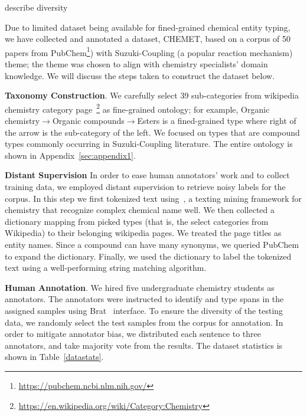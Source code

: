 describe diversity

Due to limited dataset being available for fined-grained chemical entity typing, we have collected and annotated a dataset, CHEMET, based on a corpus of 50 papers from PubChem\footnote{\url{https://pubchem.ncbi.nlm.nih.gov/}}) with Suzuki-Coupling (a popular reaction mechanism) theme; the theme was chosen to align with chemistry specialists' domain knowledge. We will discuss the steps taken to construct the dataset below.

\noindent \textbf{Taxonomy Construction}.  We carefully select 39 sub-categories from wikipedia chemistry category page~\footnote{\url{https://en.wikipedia.org/wiki/Category:Chemistry}} as fine-grained ontology; for example, Organic chemistry$\rightarrow$Organic compounds$\rightarrow$Esters is a fined-grained type where right of the arrow is the sub-category of the left.  We focused on types that are compound types commonly occurring in Suzuki-Coupling literature. The entire ontology is shown in Appendix~\ref{sec:appendix1}.

\noindent \textbf{Distant Supervision} In order to ease human annotators' work and to collect training data, we employed distant supervision to retrieve noisy labels for the corpus. In this step we first tokenized text using~\cite{oscar4}, a texting mining framework for chemistry that recognize complex chemical name well. We then collected a dictionary mapping from picked types (that is, the select categories from Wikipedia) to their belonging wikipedia pages. We treated the page titles as entity names. Since a compound can have many synonyms, we queried PubChem to expand the dictionary. Finally, we used the dictionary to label the tokenized text using a well-performing string matching algorithm. 

\noindent \textbf{Human Annotation}. 
We hired five undergraduate chemistry students as annotators. The annotators were instructed to identify and type spans in the assigned samples using Brat~\cite{brat} interface. To ensure the diversity of the testing data, we randomly select the test samples from the corpus for annotation. In order to mitigate annotator bias, we distributed each sentence to three annotators, and take majority vote from the results. The dataset statistics is shown in Table~\ref{datastats}.



%
